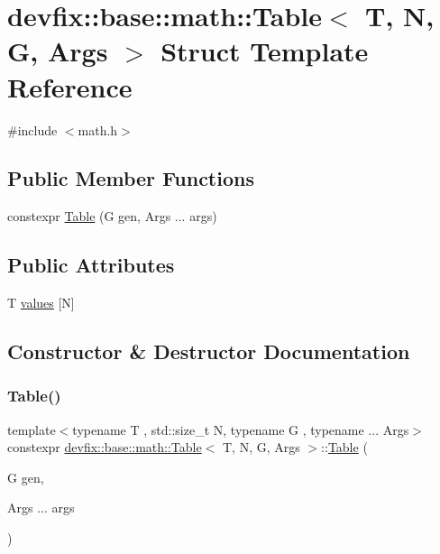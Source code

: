 \hypertarget{structdevfix_1_1base_1_1math_1_1Table}{}\section{devfix\+:\+:base\+:\+:math\+:\+:Table$<$ T, N, G, Args $>$ Struct Template Reference}
\label{structdevfix_1_1base_1_1math_1_1Table}


{\ttfamily \#include $<$math.\+h$>$}

\subsection*{Public Member Functions}
\begin{DoxyCompactItemize}
\item 
constexpr \hyperlink{structdevfix_1_1base_1_1math_1_1Table_aa9adcdb1a5d8c858690100fa20e06a2b}{Table} (G gen, Args ... args)
\end{DoxyCompactItemize}
\subsection*{Public Attributes}
\begin{DoxyCompactItemize}
\item 
T \hyperlink{structdevfix_1_1base_1_1math_1_1Table_a62c83a19d69fec924a3db9bc5bcc4777}{values} \mbox{[}N\mbox{]}
\end{DoxyCompactItemize}


\subsection{Constructor \& Destructor Documentation}
\mbox{\label{structdevfix_1_1base_1_1math_1_1Table_aa9adcdb1a5d8c858690100fa20e06a2b}} 
\subsubsection{\texorpdfstring{Table()}{Table()}}
{\footnotesize\ttfamily template$<$typename T , std\+::size\+\_\+t N, typename G , typename ... Args$>$ \\
constexpr \hyperlink{structdevfix_1_1base_1_1math_1_1Table}{devfix\+::base\+::math\+::\+Table}$<$ T, N, G, Args $>$\+::\hyperlink{structdevfix_1_1base_1_1math_1_1Table}{Table} (\begin{DoxyParamCaption}\item[{G}]{gen,  }\item[{Args ...}]{args }\end{DoxyParamCaption})\hspace{0.3cm}{\ttfamily [inline]}}



